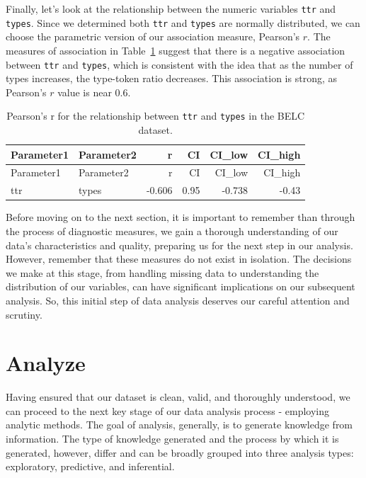 \documentclass[
  letterpaper,
  DIV=11,
  numbers=noendperiod]{scrreport}
\theoremstyle{definition}
\theoremstyle{remark}
\begin{document}
Finally, let's look at the relationship between the numeric variables
\texttt{ttr} and \texttt{types}. Since we determined both \texttt{ttr}
and \texttt{types} are normally distributed, we can choose the
parametric version of our association measure, Pearson's \(r\). The
measures of association in Table~\ref{tbl-aa-pearson-2} suggest that
there is a negative association between \texttt{ttr} and \texttt{types},
which is consistent with the idea that as the number of types increases,
the type-token ratio decreases. This association is strong, as Pearson's
\(r\) value is near 0.6.

\hypertarget{tbl-aa-pearson-2}{}
\begin{longtable}[]{@{}llrrrr@{}}
\caption{\label{tbl-aa-pearson-2}Pearson's r for the relationship
between \texttt{ttr} and \texttt{types} in the BELC
dataset.}\tabularnewline
\toprule\noalign{}
Parameter1 & Parameter2 & r & CI & CI\_low & CI\_high \\
\midrule\noalign{}
\endfirsthead
\toprule\noalign{}
Parameter1 & Parameter2 & r & CI & CI\_low & CI\_high \\
\midrule\noalign{}
\endhead
\bottomrule\noalign{}
\endlastfoot
ttr & types & -0.606 & 0.95 & -0.738 & -0.43 \\
\end{longtable}

Before moving on to the next section, it is important to remember than
through the process of diagnostic measures, we gain a thorough
understanding of our data's characteristics and quality, preparing us
for the next step in our analysis. However, remember that these measures
do not exist in isolation. The decisions we make at this stage, from
handling missing data to understanding the distribution of our
variables, can have significant implications on our subsequent analysis.
So, this initial step of data analysis deserves our careful attention
and scrutiny.

\hypertarget{sec-aa-analyze}{%
\section{Analyze}\label{sec-aa-analyze}}

Having ensured that our dataset is clean, valid, and thoroughly
understood, we can proceed to the next key stage of our data analysis
process - employing analytic methods. The goal of analysis, generally,
is to generate knowledge from information. The type of knowledge
generated and the process by which it is generated, however, differ and
can be broadly grouped into three analysis types: exploratory,
predictive, and inferential.
\end{document}
